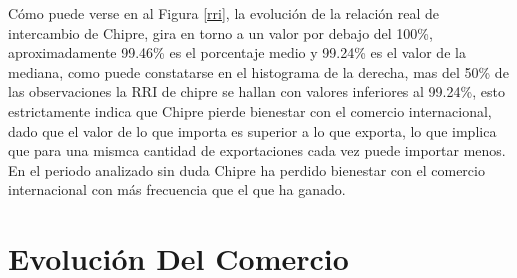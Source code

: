 \documentclass[a4paper,openright,12pt]{book}
\begin{document}
Cómo puede verse en al Figura \ref{rri}, la evolución de la relación real de intercambio de Chipre, gira en torno a un valor por debajo del 100\%, aproximadamente 99.46\% es el porcentaje medio y 99.24\% es el valor de la mediana, como puede constatarse en el histograma de la derecha, mas del 50\% de las observaciones la RRI de chipre se hallan con valores inferiores al 99.24\%, esto estrictamente indica que Chipre pierde bienestar con el comercio internacional, dado que el valor de lo que importa es superior a lo que exporta, lo que implica que para una mismca cantidad de exportaciones cada vez puede importar menos. En el periodo analizado sin duda Chipre ha perdido bienestar con el comercio internacional con más frecuencia que el que ha ganado.





\chapter{Evolución Del Comercio}
\label{cap2}
\end{document}
